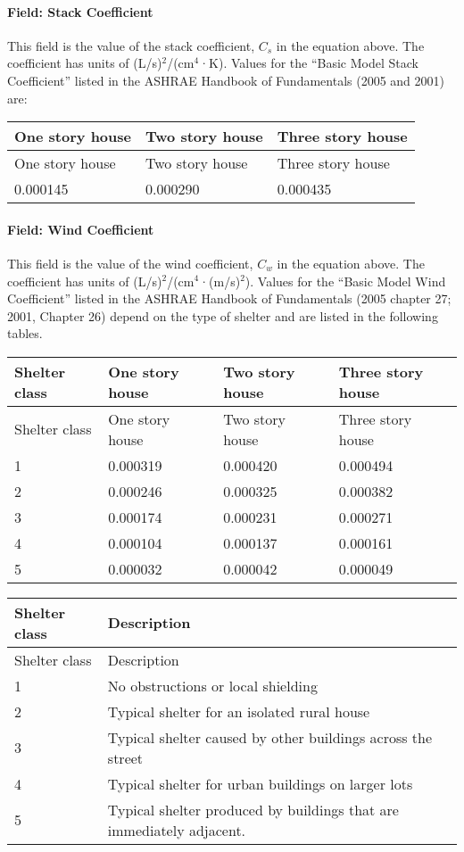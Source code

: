 \paragraph{Field: Stack Coefficient}\label{field-stack-coefficient}

This field is the value of the stack coefficient, \({C_s}\) in the equation above. The coefficient has units of (L/s)\(^{2}\)/(cm\(^{4}\)·K). Values for the ``Basic Model Stack Coefficient'' listed in the ASHRAE Handbook of Fundamentals (2005 and 2001) are:

\begin{longtable}[c]{@{}lll@{}}
\toprule
One story house & Two story house & Three story house \tabularnewline
\midrule
\endfirsthead

\toprule
One story house & Two story house & Three story house \tabularnewline
\midrule
\endhead

0.000145 & 0.000290 & 0.000435 \tabularnewline
\bottomrule
\end{longtable}

\paragraph{Field: Wind Coefficient}\label{field-wind-coefficient}

This field is the value of the wind coefficient, \({C_w}\) in the equation above. The coefficient has units of (L/s)\(^{2}\)/(cm\(^{4}\)·(m/s)\(^{2}\)). Values for the ``Basic Model Wind Coefficient'' listed in the ASHRAE Handbook of Fundamentals (2005 chapter 27; 2001, Chapter 26) depend on the type of shelter and are listed in the following tables.

\begin{longtable}[c]{@{}llll@{}}
\toprule
Shelter class & One story house & Two story house & Three story house \tabularnewline
\midrule
\endfirsthead

\toprule
Shelter class & One story house & Two story house & Three story house \tabularnewline
\midrule
\endhead

1 & 0.000319 & 0.000420 & 0.000494 \tabularnewline
2 & 0.000246 & 0.000325 & 0.000382 \tabularnewline
3 & 0.000174 & 0.000231 & 0.000271 \tabularnewline
4 & 0.000104 & 0.000137 & 0.000161 \tabularnewline
5 & 0.000032 & 0.000042 & 0.000049 \tabularnewline
\bottomrule
\end{longtable}

\begin{longtable}[c]{p{1.5in}p{4.5in}}
\toprule
Shelter class & Description \tabularnewline
\midrule
\endfirsthead

\toprule
Shelter class & Description \tabularnewline
\midrule
\endhead

1 & No obstructions or local shielding \tabularnewline
2 & Typical shelter for an isolated rural house \tabularnewline
3 & Typical shelter caused by other buildings across the street \tabularnewline
4 & Typical shelter for urban buildings on larger lots \tabularnewline
5 & Typical shelter produced by buildings that are immediately adjacent. \tabularnewline
\bottomrule
\end{longtable}

